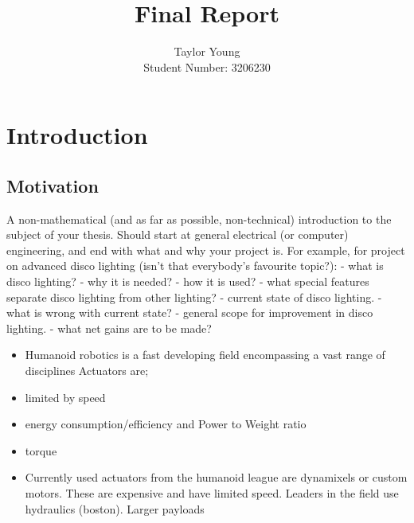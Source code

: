 \documentclass[11pt,a4paper]{article}
\title{Final Report}
\author{Taylor Young\\Student Number: 3206230}
\newcommand{\blankpage}{
\newpage
\thispagestyle{empty}
\mbox{}
\newpage
\addtocounter{page}{-1}
}
\begin{document}
\def\isfinalreport{1}

\blankpage
{}



\blankpage


\blankpage


\blankpage

\tableofcontents
\newpage


\section{Introduction}
\label{sec:introduction}



\subsection{Motivation}
\label{sub:motivation}

A non-mathematical (and as far as possible, non-technical) introduction to the subject of your
thesis. Should start at general electrical (or computer) engineering, and end with what and
why your project is. For example, for project on advanced disco lighting (isn't that
everybody's favourite topic?): \newline
- what is disco lighting? \newline
- why it is needed? \newline
- how it is used? \newline
- what special features separate disco lighting from other lighting? \newline
- current state of disco lighting. \newline
- what is wrong with current state? \newline
- general scope for improvement in disco lighting. \newline
- what net gains are to be made?

\begin{itemize}
\item Humanoid robotics is a fast developing field encompassing a vast range of disciplines Actuators are;
\item limited by speed
\item energy consumption/efficiency and Power to Weight ratio
\item torque
\item Currently used actuators from the humanoid league are dynamixels or custom motors. These are expensive and have limited speed. Leaders in the field use hydraulics (boston). Larger payloads
\end{itemize}
\end{document}
